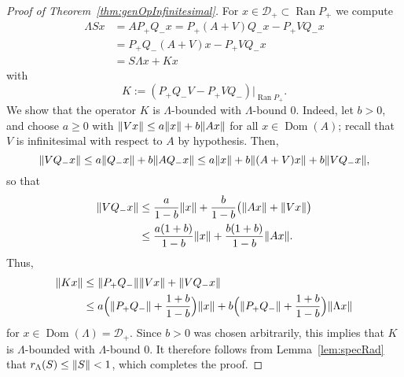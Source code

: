 \documentclass[11pt,a4paper]{amsart}
\numberwithin{equation}{section}
\DeclareMathOperator{\Ran}{Ran}
\DeclareMathOperator{\Dom}{Dom}
\DeclarePairedDelimiter{\norm}{\lVert}{\rVert}
\newcommand{\cD}{{\mathcal D}}
\theoremstyle{plain}
\theoremstyle{definition}
\theoremstyle{remark}
\begin{document}
\begin{proof}[Proof of Theorem~\ref{thm:genOpInfinitesimal}]
  For $x\in\cD_+\subset\Ran P_+$ we compute
  \begin{align*}
    \Lambda Sx
    &=
    AP_+Q_-x
      = P_+(A+V)Q_-x - P_+VQ_-x\\
    &=
    P_+Q_-(A+V)x - P_+VQ_-x\\
    &=
    S\Lambda x + Kx
  \end{align*}
  with
  \begin{equation*}
    K := (P_+Q_-V - P_+VQ_-)|_{\Ran P_+}.
  \end{equation*}
  We show that the operator $K$ is $\Lambda$-bounded with $\Lambda$-bound $0$. Indeed, let $b > 0$, and choose $a\ge0$ with
  $\norm{Vx}\le a\norm{x}+b\norm{Ax}$ for all $x\in\Dom(A)$; recall that $V$ is infinitesimal with respect to $A$ by hypothesis.
  Then,
  \begin{equation*}
    \norm{VQ_-x}
    \le
    a\norm{Q_-x} + b\norm{AQ_-x}
    \le
    a\norm{x} + b\norm{(A+V)x} + b\norm{VQ_-x},
  \end{equation*}
  so that
  \begin{align*}
    \norm{VQ_-x}
    &\le
    \frac{a}{1-b}\norm{x} + \frac{b}{1-b}\bigl(\norm{Ax}+\norm{Vx}\bigr)\\
    &\le
    \frac{a(1+b)}{1-b}\norm{x} + \frac{b(1+b)}{1-b}\norm{Ax}.
  \end{align*}
  Thus,
  \begin{equation}\label{eq:relBoundK}
   \begin{aligned}
    \norm{Kx}
    &\le
    \norm{P_+Q_-}\norm{Vx} + \norm{VQ_-x}\\
    &\le
    a\Bigl(\norm{P_+Q_-} + \frac{1+b}{1-b}\Bigr)\norm{x} + b\Bigl(\norm{P_+Q_-}+\frac{1+b}{1-b}\Bigr)\norm{\Lambda x}
   \end{aligned}
  \end{equation}
  for $x\in\Dom(\Lambda)=\cD_+$. Since $b>0$ was chosen arbitrarily, this implies that $K$ is $\Lambda$-bounded with
  $\Lambda$-bound $0$. It therefore follows from Lemma~\ref{lem:specRad} that $r_\Lambda(S)\le\norm{S}<1$, which completes the
  proof.
\end{proof}%
\end{document}
